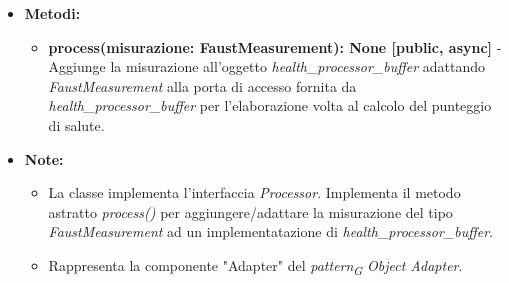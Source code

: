 \begin{itemize}
\begin{itemize}
    \item \textbf{Metodi: }
    \begin{itemize}
        \item \textbf{process(misurazione: FaustMeasurement): None [public, async]} - Aggiunge la misurazione all'oggetto \textit{health\_processor\_buffer} adattando \textit{FaustMeasurement} alla porta di accesso fornita da \textit{health\_processor\_buffer} per l'elaborazione volta al calcolo del punteggio di salute.
    \end{itemize}
    \item\textbf{Note:}
        \begin{itemize}
            \item La classe implementa l'interfaccia \textit{Processor}. Implementa il metodo astratto \textit{process()} per aggiungere/adattare la misurazione del tipo \textit{FaustMeasurement} ad un implementatazione di \textit{health\_processor\_buffer}.
            \item Rappresenta la componente "Adapter" del \textit{pattern}\textsubscript{\textit{G}} \textit{Object Adapter}.
        \end{itemize}
    \end{itemize}
\end{itemize}